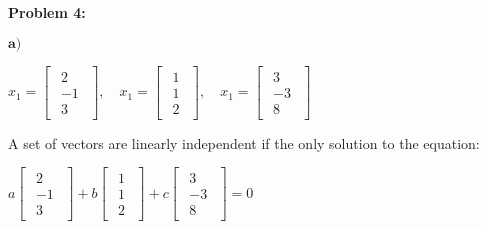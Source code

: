 \textbf{Problem 4:}

\singlespacing

$\textbf{a)}$

\singlespacing

\begin{math}
    x_1 = \begin{bmatrix}
        \begin{array}{c}
            2  \\
            -1 \\
            3
        \end{array}
    \end{bmatrix},\quad
    x_1 = \begin{bmatrix}
        \begin{array}{c}
            1 \\
            1 \\
            2
        \end{array}
    \end{bmatrix},\quad
    x_1 = \begin{bmatrix}
        \begin{array}{c}
            3  \\
            -3 \\
            8
        \end{array}
    \end{bmatrix}
\end{math}

\singlespacing
\singlespacing

A set of vectors are linearly independent if the only solution to the equation:

\singlespacing
\singlespacing

\begin{math}
    a \begin{bmatrix}
        \begin{array}{c}
            2  \\
            -1 \\
            3
        \end{array}
    \end{bmatrix}
    +b \begin{bmatrix}
        \begin{array}{c}
            1 \\
            1 \\
            2
        \end{array}
    \end{bmatrix}
    +c \begin{bmatrix}
        \begin{array}{c}
            3  \\
            -3 \\
            8
        \end{array}
    \end{bmatrix}
    = 0
\end{math}


